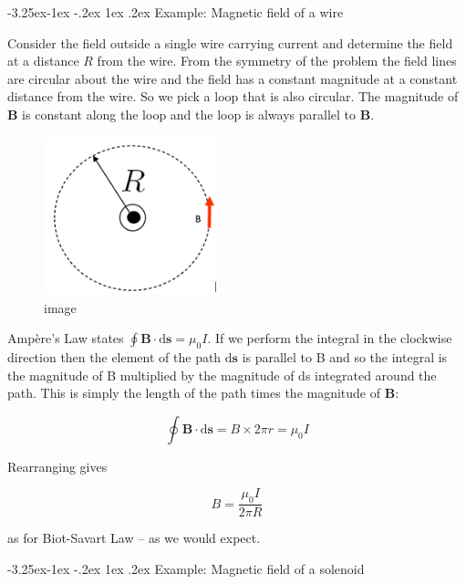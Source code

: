 \documentclass[
]{book}
\makeatletter
\renewcommand\subsection{%
\@startsection{subsection}{2}{\z@}%
              {-3.25ex\@plus -1ex \@minus -.2ex}%
              {1ex \@plus .2ex}%
              {\sffamily\bfseries}}
\numberwithin{equation}{section}
\makeatother
\begin{document}
\hypertarget{example-magnetic-field-of-a-wire}{%
\subsection{Example: Magnetic field of a wire}\label{example-magnetic-field-of-a-wire}}

Consider the field outside a single wire carrying current and determine
the field at a distance \(R\) from the wire. From the symmetry of the
problem the field lines are circular about the wire and the field has a
constant magnitude at a constant distance from the wire. So we pick a
loop that is also circular. The magnitude of \(\mathbf{B}\) is constant along the
loop and the loop is always parallel to \(\mathbf{B}\).

\begin{figure}
\centering
\includegraphics[width=50mm,height=\textheight]{Figures/wireField.png}
\caption{image}
\end{figure}

Ampère's Law states \(\oint \mathbf{B} \cdot \mathrm{d}\mathbf{s} = \mu_0 I\). If we perform the
integral in the clockwise direction then the element of the path \(\mathrm{d}\mathbf{s}\)
is parallel to B and so the integral is the magnitude of B multiplied by
the magnitude of ds integrated around the path. This is simply the
length of the path times the magnitude of \(\mathbf{B}\):

\begin{equation}
\label{eq:ointB2}
\oint \mathbf{B} \cdot \mathrm{d}\mathbf{s} = B \times 2\pi r = \mu_0 I
\end{equation}

Rearranging gives

\begin{equation}
\label{eq:BiotSavart}
B = \frac{\mu_0 I}{2\pi R}
\end{equation}

as for Biot-Savart Law -- as we would expect.

\hypertarget{example-magnetic-field-of-a-solenoid}{%
\subsection{Example: Magnetic field of a solenoid}\label{example-magnetic-field-of-a-solenoid}}
\end{document}
